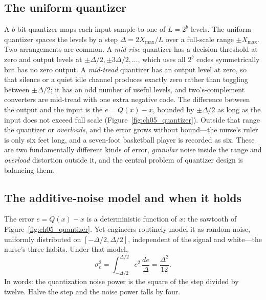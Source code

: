 \subsection{The uniform quantizer}

A $b$-bit quantizer maps each input sample to one of $L=2^b$ levels. The uniform quantizer
spaces the levels by a step $\Delta=2X_{\max}/L$ over a full-scale range $\pm X_{\max}$. Two
arrangements are common. A \emph{mid-rise} quantizer has a decision threshold at zero and
output levels at $\pm\Delta/2,\pm3\Delta/2,\dots$, which uses all $2^b$ codes symmetrically
but has no zero output. A \emph{mid-tread} quantizer has an output level at zero, so that
silence or a quiet idle channel produces exactly zero rather than toggling between
$\pm\Delta/2$; it has an odd number of useful levels, and two's-complement converters are
mid-tread with one extra negative code. The difference between the output and the input is
the  $e=Q(x)-x$, bounded by $\pm\Delta/2$ as long as the input does not
exceed full scale (Figure~\ref{fig:ch05_quantizer}). Outside that range the quantizer
 or \emph{overloads}, and the error grows without bound---the nurse's ruler is only
six feet long, and a seven-foot basketball player is recorded as six. These are two fundamentally
different kinds of error, \emph{granular} noise inside the range and \emph{overload} distortion
outside it, and the central problem of quantizer design is balancing them.


\subsection{The additive-noise model and when it holds}

The error $e=Q(x)-x$ is a deterministic function of $x$: the sawtooth of
Figure~\ref{fig:ch05_quantizer}. Yet engineers routinely model it as random noise, uniformly
distributed on $[-\Delta/2,\Delta/2]$, independent of the signal and white---the nurse's three
habits. Under that model,
\begin{equation}
\sigma_e^2=\int_{-\Delta/2}^{\Delta/2}e^2\,\frac{de}{\Delta}=\frac{\Delta^2}{12}.
\label{eq:ch05:d212}
\end{equation}
In words: the quantization noise power is the square of the step divided by twelve. Halve the
step and the noise power falls by four.

